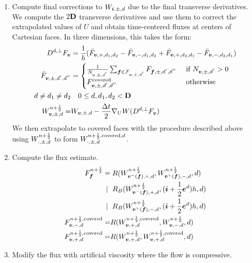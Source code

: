 \begin{enumerate}
\item Compute final corrections to $W_{{\boldsymbol{i}}, \pm, d}$ due to
the final transverse derivatives. 
We compute the $2{\mathbf{D}}$ transverse derivatives and use them to
correct the extrapolated values of $U$ and obtain time-centered fluxes
at centers of Cartesian faces. In three dimensions, this takes the form:
\begin{align}
\begin{split}
D^{d, \bot} F_{\boldsymbol{v}} &= \frac{1}{h}(\bar{F}_{{\boldsymbol{v}}, +, d_1, d_2} -
\bar{F}_{{\boldsymbol{v}}, -, d_1, d_2} + \bar{F}_{{\boldsymbol{v}}, +, d_2, d_1} -
\bar{F}_{{\boldsymbol{v}}, -, d_2, d_1}) \\
 \bar{F}_{{\boldsymbol{v}}, \pm, d^{'}, d^{''}} &= 
\begin{cases}
\frac{1}{N_{{\boldsymbol{v}}, \pm, d^{'}}}
\sum_{{\boldsymbol{f}} \in \mathcal{F}_{{\boldsymbol{v}}, \pm, d^{'}}} F_{{\boldsymbol{f}}, \pm, d^{'},
d^{''}} & \mbox{ if } N_{{\boldsymbol{v}}, \pm, d^{'}} > 0 
\\
F^{\text{covered}}_{{\boldsymbol{v}}, \pm, d^{'}, d^{''}} & \text{ otherwise} \\
\end{cases} 
\\
d \neq d_1 \neq d_2 & ~~~ 0 \le d, d_1, d_2 < {\mathbf{D}} \\
W^{n + \frac{1}{2}}_{{\boldsymbol{v}}, \pm, d} =& W_{{\boldsymbol{v}}, \pm, d} - \frac{\Delta t}{2}
\nabla_U W (D^{d, \bot} F_{\boldsymbol{v}}) \\
\end{split}
\end{align}
We then extrapolate to covered faces with the procedure described above using 
$W^{n + \frac{1}{2}}_{\cdot, \pm, d}$ to form $W^{{n + \frac{1}{2}}, \text{covered},d}_{\cdot, \pm, d}$.

\item Compute the flux estimate.
\begin{align}
\begin{split}
F^{n+\frac{1}{2}}_{{\boldsymbol{f}}} = & \;
R(W^{n+\frac{1}{2}}_{{\boldsymbol{v}}^-({\boldsymbol{f}}), +, d}, W^{n+\frac{1}{2}}_{{\boldsymbol{v}}^+({\boldsymbol{f}}), - ,d},  d) \\ 
| ~ & \; R_B(W^{n+\frac{1}{2}}_{{\boldsymbol{v}}^-({\boldsymbol{f}}), +, d}, ({\boldsymbol{i}} + \frac{1}{2} {\boldsymbol{e}}^d)h, d) \\ 
| ~ & \; R_B(W^{n+\frac{1}{2}}_{{\boldsymbol{v}}^+({\boldsymbol{f}}), -, d}, ({\boldsymbol{i}} + \frac{1}{2} {\boldsymbol{e}}^d)h, d) \\
F^{n+\frac{1}{2},\text{covered}}_{{\boldsymbol{v}}, -, d} = &
 R(W^{n+\frac{1}{2},\text{covered}}_{{\boldsymbol{v}},+,d},W^{{n + \frac{1}{2}}}_{{\boldsymbol{v}},-,d},d) \\
F^{n+\frac{1}{2},\text{covered}}_{{\boldsymbol{v}}, +, d} = &
 R(W^{n+\frac{1}{2}}_{{\boldsymbol{v}},+,d},W^{{n + \frac{1}{2}},\text{covered}}_{{\boldsymbol{v}},+,d},d)
\end{split}
\label{eqn::riemann3}
\end{align}

\item Modify the flux with artificial viscosity where the
flow is compressive. 

\end{enumerate}

